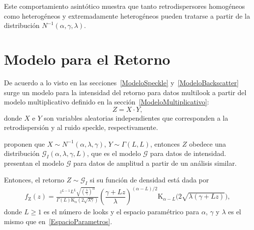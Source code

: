 Este comportamiento asintótico muestra que tanto retrodispersores homogéneos como heterogéneos y extremadamente heterogéneos pueden tratarse a partir de la distribución $N^{-1}(\alpha,\gamma,\lambda)$.


\section{Modelo para el Retorno}
\label{Retorno}

De acuerdo a lo visto en las secciones~\ref{ModeloSpeckle} y~\ref{ModeloBackscatter} surge un modelo para la intensidad del retorno para datos multilook a partir del modelo multiplicativo definido en la sección~\ref{ModeloMultiplicativo}:
\begin{equation*}
Z=X \cdot Y  ,
\end{equation*}
donde $X$ e $Y$ son variables aleatorias independientes que corresponden a la retrodispersión y al ruido speckle, respectivamente. 

 \citet{Frery99} proponen que $X \sim N^{-1}(\alpha,\lambda,\gamma )$, $Y \sim \Gamma(L,L)$, entonces $Z$ obedece una distribución $\mathcal G_I(\alpha,\lambda,\gamma,L )$, que es el modelo $\mathcal{G}$ para datos de intensidad. \citet{Frery97} presentan el modelo $\mathcal{G}$ para datos de amplitud a partir de un análisis similar.

Entonces, el retorno $Z \sim \mathcal{G}_I$ si su función de densidad está dada por
\begin{align}
\label{ModeloGI}
f_{\text{Z}}( z) =\frac{z^{L-1} L^L \sqrt{(\frac{\lambda}{\gamma})^{\alpha}}}{\Gamma(L)\text{K}_{\alpha}(2 \sqrt{\lambda \gamma})} \left(\dfrac{\gamma + Lz}{\lambda}\right)^{(\alpha-L)/2} \text{K}_{\alpha-L}\Big(2\sqrt{\lambda(\gamma+Lz) }\Big),
\end{align}
donde $L\geq 1$ es el número de looks y el espacio paramétrico para $\alpha$, $\gamma$ y $\lambda$ es el mismo que en~\eqref{EspacioParametros}.


